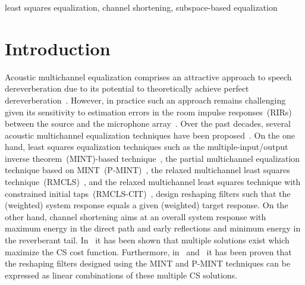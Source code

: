 \documentclass[11pt,draftcls,onecolumn]{IEEEtran}
\begin{document}
\begin{keywords}
least squares equalization, channel shortening, subspace-based equalization
\end{keywords}

\section{Introduction}
Acoustic multichannel equalization comprises an attractive approach to speech dereverberation due to its potential to theoretically achieve perfect dereverberation~\cite{Miyoshi_ITASS_1988,Kodrasi_ITASLP_2013}.
However, in practice such an approach remains challenging given its sensitivity to estimation errors in the room impulse responses~(RIRs) between the source and the microphone array~\cite{Kodrasi_ITASLP_2013,Zhang_IWAENC_2010}.
Over the past decades, several acoustic multichannel equalization techniques have been proposed~\cite{Miyoshi_ITASS_1988,Kodrasi_ITASLP_2013,Zhang_IWAENC_2010,Lim_IWAENC_2012,Kallinger_ICASSP_2006,Lim_ICASSP_2013,Lim_WASPAA_2013,Mertins_ITASLP_2010,Jungmann_ICASSP_2014}.
On the one hand, least squares equalization techniques such as the multiple-input/output inverse theorem~(MINT)-based technique~\cite{Miyoshi_ITASS_1988}, the partial multichannel equalization technique based on MINT~(P-MINT)~\cite{Kodrasi_ITASLP_2013}, the relaxed multichannel least squares technique~(RMCLS)~\cite{Zhang_IWAENC_2010}, and the relaxed multichannel least squares technique with constrained initial taps~(RMCLS-CIT)~\cite{Lim_IWAENC_2012}, design reshaping filters such that the (weighted) system response equals a given (weighted) target response. 
On the other hand, channel shortening aims at an overall system response with maximum energy in the direct path and early reflections and minimum energy in the reverberant tail.
In~\cite{Zhang_IWAENC_2010} it has been shown that multiple solutions exist which maximize the CS cost function.
Furthermore, in~\cite{Kodrasi_ITASLP_2013} and~\cite{Zhang_IWAENC_2010} it has been proven that the reshaping filters designed using the MINT and P-MINT techniques can be expressed as linear combinations of these multiple CS solutions.
\end{document}
